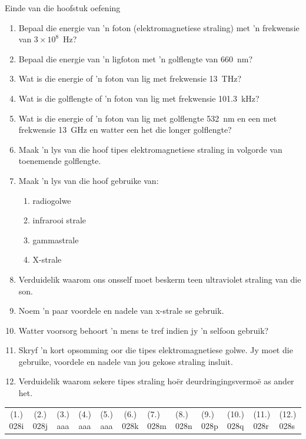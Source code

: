 \begin{eocexercises}{Einde van die hoofstuk oefening}
\begin{enumerate}[noitemsep, label=\textbf{\arabic*}. ] 
    \item Bepaal die energie van 'n foton (e\-lek\-tro\-mag\-ne\-tie\-se straling) met 'n frekwensie van $3\ensuremath{\times}{10}^{8}$~Hz?
    \item Bepaal die energie van 'n ligfoton met 'n golflengte van 660~nm?

\item Wat is die energie of 'n foton van lig met frekwensie 13~THz?

\item Wat is die golflengte of 'n foton van lig met frekwensie 101.3~kHz?

\item Wat is die energie of 'n foton van lig met golflengte 532~nm en een met frekwensie 13~GHz en watter een het die longer golflengte?

    \item Maak 'n lys van die hoof tipes elektromagnetiese straling in volgorde van toenemende golflengte.
    \item Maak 'n lys van die hoof gebruike van:
\begin{enumerate}[noitemsep, label=\textbf{\alph*}. ] 
    \item radiogolwe
    \item infrarooi strale
    \item gammastrale
    \item X-strale
\end{enumerate}
\item Verduidelik waarom ons onsself moet beskerm teen ultraviolet straling van die son. 
\item Noem 'n paar voordele en nadele van x-strale se gebruik. 
\item Watter voorsorg behoort 'n mens te tref indien jy 'n selfoon gebruik? 
\item Skryf 'n kort opsomming oor die tipes elektromagnetiese golwe. Jy moet die gebruike, voordele en nadele van jou gekose straling insluit.
\item Verduidelik waarom sekere tipes straling ho\"er deurdringingsvermo\"e as ander het.

\end{enumerate}
  \label{m38779**end}
  \label{459e2bef85baf867f5850bc8338cad3a**end}
\practiceinfo
 \par \begin{tabular}[h]{cccccc}
 (1.) 028i  &  (2.) 028j  & (3.) aaa & (4.) aaa & (5.) aaa & (6.) 028k  &  (7.) 028m  &  (8.) 028n  &  (9.) 028p  &  (10.) 028q  &  (11.) 028r  &  (12.) 028s  

\end{tabular}
\end{eocexercises}
